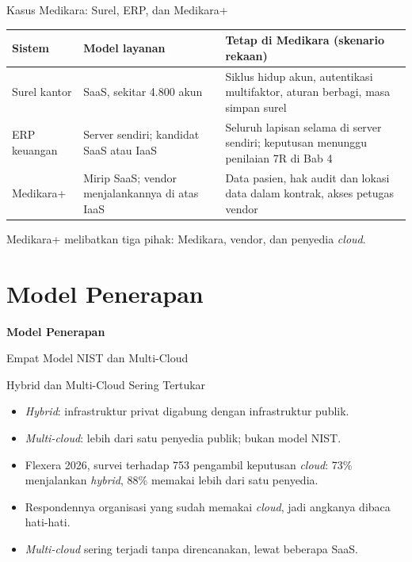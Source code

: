 \documentclass[aspectratio=169, table, 12pt]{beamer}
\begin{document}
\begin{frame}{Kasus Medikara: Surel, ERP, dan Medikara+}
  \footnotesize
  \begin{tabularx}{\textwidth}{>{\raggedright\arraybackslash}p{2.0cm}
      >{\raggedright\arraybackslash}p{3.6cm} >{\raggedright\arraybackslash}X}
    \hline
    \textbf{Sistem} & \textbf{Model layanan} & \textbf{Tetap di Medikara (skenario rekaan)}
      \\
    \hline
    Surel kantor & SaaS, sekitar 4.800 akun & Siklus hidup akun, autentikasi multifaktor,
      aturan berbagi, masa simpan surel \\
    \hline
    ERP keuangan & Server sendiri; kandidat SaaS atau IaaS & Seluruh lapisan selama di server
      sendiri; keputusan menunggu penilaian 7R di Bab 4 \\
    \hline
    Medikara+ & Mirip SaaS; vendor menjalankannya di atas IaaS & Data pasien, hak audit dan
      lokasi data dalam kontrak, akses petugas vendor \\
    \hline
  \end{tabularx}

  \vspace{8pt}
  \small Medikara+ melibatkan tiga pihak: Medikara, vendor, dan penyedia \textit{cloud}.
\end{frame}

\section{Model Penerapan}

\begin{frame}{\hfill}
  \centering
  \Huge{\textbf{Model Penerapan}}
\end{frame}

\begin{frame}{Empat Model NIST dan Multi-Cloud}
  \begin{center}
  \end{center}
\end{frame}

\begin{frame}{Hybrid dan Multi-Cloud Sering Tertukar}
  \small
  \begin{itemize}
    \item \textit{Hybrid}: infrastruktur privat digabung dengan infrastruktur publik.
    \item \textit{Multi-cloud}: lebih dari satu penyedia publik; bukan model NIST.
    \item Flexera 2026, survei terhadap 753 pengambil keputusan \textit{cloud}: 73\%
          menjalankan \textit{hybrid}, 88\% memakai lebih dari satu penyedia.
    \item Respondennya organisasi yang sudah memakai \textit{cloud}, jadi angkanya dibaca
          hati-hati.
    \item \textit{Multi-cloud} sering terjadi tanpa direncanakan, lewat beberapa SaaS.
  \end{itemize}
\end{frame}
\end{document}
